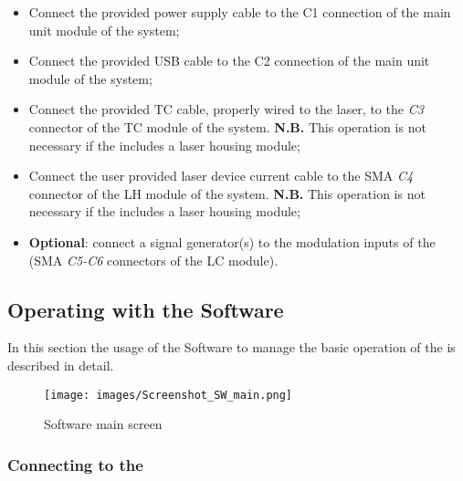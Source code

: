 \begin{itemize}
    \item Connect the provided power supply cable to the C1 connection of the main unit module of the \QubeModel  system;
    \item Connect the provided USB cable to the C2 connection of the main unit module of the \QubeModel  system;
    \item Connect the provided TC cable, properly wired to the laser, to the \textit{C3} connector of the TC module of the \QubeModel  system. 
    \newline \textbf{N.B.} This operation is not necessary if the \QubeModel  includes a laser housing module;
    \item Connect the user provided laser device current cable to the SMA \textit{C4} connector of the LH module of the \QubeModel  system. 
    \newline \textbf{N.B.} This operation is not necessary if the \QubeModel  includes a laser housing module;
    \item \textbf{Optional}: connect a signal generator(s) to the modulation inputs of the \QubeModel  (SMA \textit{C5-C6} connectors of the LC module).
\end{itemize}





\subsection{Operating with the \SoftwareType Software}    \label{Operating_with_SW_chapter}
In this section the usage of the \SoftwareType Software to manage the basic operation of the \QubeModel  is described in detail.
\begin{center}
    \begin{figure}[!h]
        \texttt{[image: images/Screenshot\_SW\_main.png]}
        \caption{ \SoftwareType Software main screen}
        \label{fig:SW_main}
    \end{figure}
\end{center}





\subsubsection{Connecting to the \QubeModel }
